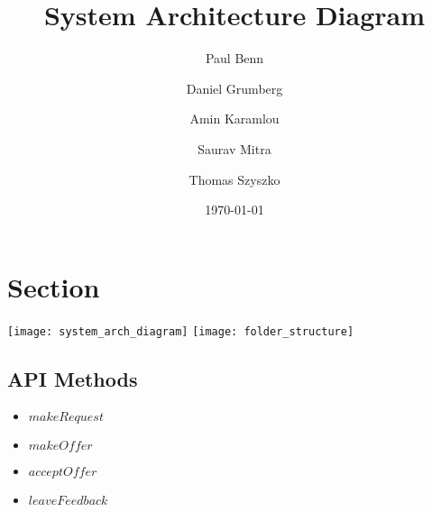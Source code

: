 \documentclass[a4wide, 11pt]{article}
\begin{document}
\title{System Architecture Diagram}

\author{Paul Benn \and Daniel Grumberg \and Amin Karamlou \and Saurav Mitra \and Thomas Szyszko }

\date{\today}


\clearpage

\section{Section}

\texttt{[image: system\_arch\_diagram]}
\texttt{[image: folder\_structure]}

\subsection{API Methods} 
\begin{itemize}
  \item $makeRequest$
  \item $makeOffer$
  \item $acceptOffer$
  \item $leaveFeedback$
\end{itemize}
\end{document}
